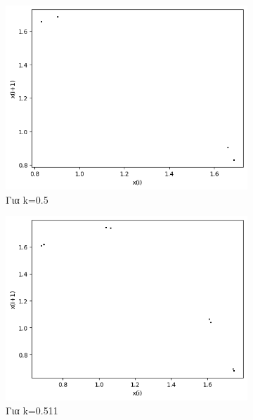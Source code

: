 \begin{figure}[h!]
\begin{subfigure}[b]{0.25\textwidth}
		\includegraphics[width=\textwidth]{LateX images/graphs q03/g5}
		\caption{Για k=0.5}
		\label{f:k17}
	\end{subfigure}
	\hfill
	\begin{subfigure}[b]{0.25\textwidth}
		\centering
		\includegraphics[width=\textwidth]{LateX images/graphs q03/g6}
		\caption{Για k=0.511}
		\label{f:k18}
	\end{subfigure}
	\hfill
	\begin{subfigure}[b]{0.25\textwidth}
		\centering

\end{subfigure}
\end{figure}
